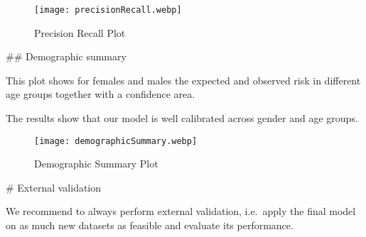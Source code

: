 \documentclass[
]{article}
\newenvironment{Shaded}{\begin{snugshade}}{\end{snugshade}}
\newcommand{\AttributeTok}[1]{\textcolor[rgb]{0.13,0.29,0.53}{#1}}
\newcommand{\CommentTok}[1]{\textcolor[rgb]{0.56,0.35,0.01}{\textit{#1}}}
\newcommand{\FunctionTok}[1]{\textcolor[rgb]{0.13,0.29,0.53}{\textbf{#1}}}
\newcommand{\NormalTok}[1]{#1}
\newcommand{\OtherTok}[1]{\textcolor[rgb]{0.56,0.35,0.01}{#1}}
\newcommand{\SpecialCharTok}[1]{\textcolor[rgb]{0.81,0.36,0.00}{\textbf{#1}}}
\newcommand{\StringTok}[1]{\textcolor[rgb]{0.31,0.60,0.02}{#1}}
\begin{document}
\begin{figure}
\centering
\texttt{[image: precisionRecall.webp]}
\caption{Precision Recall Plot}
\end{figure}

\newpage

\#\# Demographic summary

This plot shows for females and males the expected and observed risk in
different age groups together with a confidence area.

The results show that our model is well calibrated across gender and age
groups.

\begin{figure}
\centering
\texttt{[image: demographicSummary.webp]}
\caption{Demographic Summary Plot}
\end{figure}

\newpage

\# External validation

We recommend to always perform external validation, i.e.~apply the final
model on as much new datasets as feasible and evaluate its performance.

\begin{Shaded}
\end{Shaded}
\end{document}
